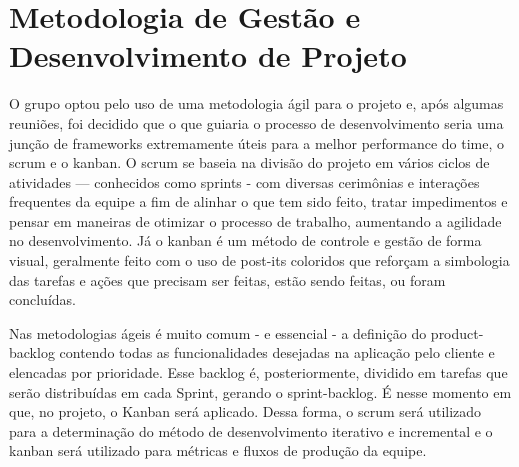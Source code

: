 \section{Metodologia de Gestão e Desenvolvimento de Projeto}
O grupo optou pelo uso de uma metodologia ágil para o projeto e, após
algumas reuniões, foi decidido que o que guiaria o processo de
desenvolvimento seria uma junção de frameworks extremamente úteis para
a melhor performance do time, o \gls{scrum} e o \gls{kanban}. O \gls{scrum}
se baseia na divisão do projeto em vários ciclos de atividades ---
conhecidos como sprints - com diversas cerimônias e interações
frequentes da equipe a fim de alinhar o que tem sido feito, tratar
impedimentos e pensar em maneiras de otimizar o processo de trabalho,
aumentando a agilidade no desenvolvimento. Já o \gls{kanban} é um
método de controle e gestão de forma visual, geralmente feito com o
uso de post-its coloridos que reforçam a simbologia das tarefas e
ações que precisam ser feitas, estão sendo feitas, ou foram
concluídas.

Nas metodologias ágeis é muito comum - e essencial - a
definição do \gls{product-backlog} contendo todas as funcionalidades
desejadas na aplicação pelo cliente e elencadas por prioridade. Esse
backlog é, posteriormente, dividido em tarefas que serão distribuídas
em cada Sprint, gerando o \gls{sprint-backlog}. É nesse momento em que, no
projeto, o Kanban será aplicado. Dessa forma, o \gls{scrum} será utilizado
para a determinação do método de desenvolvimento iterativo e
incremental e o \gls{kanban} será utilizado para métricas e fluxos de
produção da equipe.
